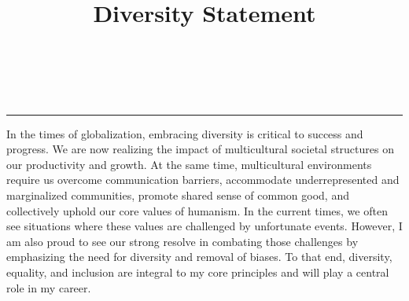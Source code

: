 \documentclass{NSF}
\begin{document}
\title{Diversity Statement}\\
\\\rule{\textwidth}{1.5pt}\vspace{3mm}
\thispagestyle{empty}

In the times of globalization, embracing diversity is critical to success and progress. We are now realizing the impact of multicultural societal structures on our productivity and growth. At the same time, multicultural environments require us overcome communication barriers, accommodate underrepresented and marginalized communities, promote shared sense of common good, and collectively uphold our core values of humanism. In the current times, we often see situations where these values are challenged by unfortunate events. However, I am also proud to see our strong resolve in combating those challenges by emphasizing the need for diversity and removal of biases. To that end, diversity, equality, and inclusion are integral to my core principles and will play a central role in my career. 
\end{document}
